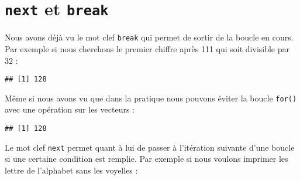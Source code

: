 \documentclass[]{book}
\newenvironment{Shaded}{\begin{snugshade}}{\end{snugshade}}
\newcommand{\KeywordTok}[1]{\textcolor[rgb]{0.13,0.29,0.53}{\textbf{#1}}}
\newcommand{\DecValTok}[1]{\textcolor[rgb]{0.00,0.00,0.81}{#1}}
\newcommand{\StringTok}[1]{\textcolor[rgb]{0.31,0.60,0.02}{#1}}
\newcommand{\ControlFlowTok}[1]{\textcolor[rgb]{0.13,0.29,0.53}{\textbf{#1}}}
\newcommand{\OperatorTok}[1]{\textcolor[rgb]{0.81,0.36,0.00}{\textbf{#1}}}
\newcommand{\NormalTok}[1]{#1}
\theoremstyle{definition}
\theoremstyle{definition}
\theoremstyle{definition}
\theoremstyle{remark}
\begin{document}
\hypertarget{l17spe}{\section{\texorpdfstring{\texttt{next} et
\texttt{break}}{next et break}}\label{l17spe}}

Nous avons déjà vu le mot clef \texttt{break} qui permet de sortir de la
boucle en cours. Par exemple si nous cherchons le premier chiffre après
111 qui soit divisible par 32 :

\begin{Shaded}
\end{Shaded}

\begin{verbatim}
## [1] 128
\end{verbatim}

Même si nous avons vu que dans la pratique nous pouvons éviter la boucle
\texttt{for()} avec une opération sur les vecteurs :

\begin{Shaded}
\end{Shaded}

\begin{verbatim}
## [1] 128
\end{verbatim}

Le mot clef \texttt{next} permet quant à lui de passer à l'itération
suivante d'une boucle si une certaine condition est remplie. Par exemple
si nous voulons imprimer les lettre de l'alphabet sans les voyelles :

\begin{Shaded}
\end{Shaded}
\end{document}

